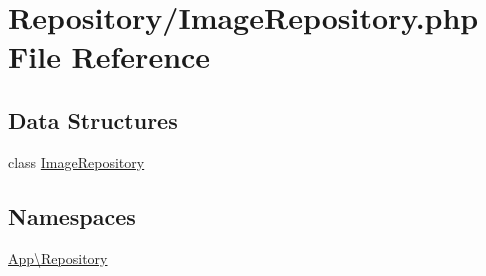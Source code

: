 \hypertarget{_image_repository_8php}{}\section{Repository/\+Image\+Repository.php File Reference}
\label{_image_repository_8php}
\subsection*{Data Structures}
\begin{DoxyCompactItemize}
\item 
class \mbox{\hyperlink{class_app_1_1_repository_1_1_image_repository}{Image\+Repository}}
\end{DoxyCompactItemize}
\subsection*{Namespaces}
\begin{DoxyCompactItemize}
\item 
 \mbox{\hyperlink{namespace_app_1_1_repository}{App\textbackslash{}\+Repository}}
\end{DoxyCompactItemize}
